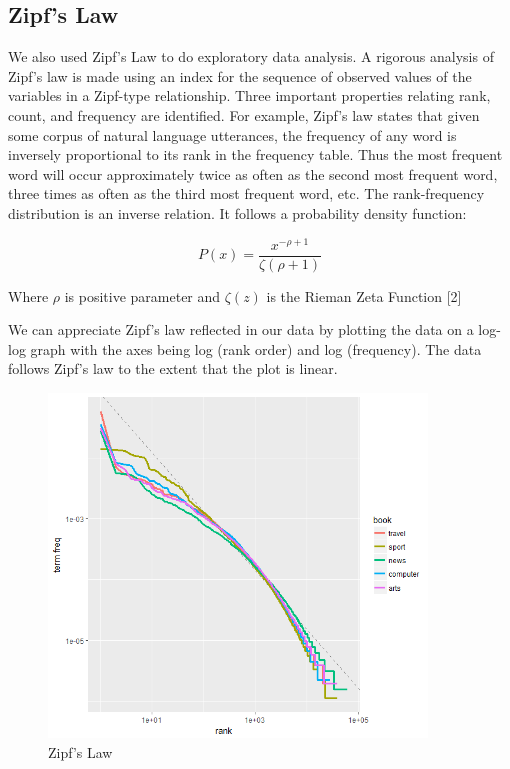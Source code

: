\documentclass[12pt]{article}
\begin{document}
\begin{center}
\subsection{Zipf's Law}
\end{center}

We also used Zipf's Law to do exploratory data analysis. A rigorous analysis of Zipf's law is made using an index for the sequence of observed values of the variables in a Zipf-type relationship. Three important properties relating rank, count, and frequency are identified. For example, Zipf's law states that given some corpus of natural language utterances, the frequency of any word is inversely proportional to its rank in the frequency table. Thus the most frequent word will occur approximately twice as often as the second most frequent word, three times as often as the third most frequent word, etc. The rank-frequency distribution is an inverse relation. It follows a probability density function:

\begin{equation}
P(x) = \frac{x^{-\rho + 1}}{\zeta(\rho + 1)}
\end{equation}

Where $\rho$ is positive parameter and $\zeta(z)$ is the Rieman Zeta Function [2]

We can appreciate Zipf's law reflected in our data by plotting the data on a log-log graph with the axes being log (rank order) and log (frequency). The data follows Zipf's law to the extent that the plot is linear.

\begin{figure}[ht!]
\includegraphics[width=100.49mm]{zipfs_law.png}
    \caption{Zipf's Law}
\end{figure}
\end{document}
